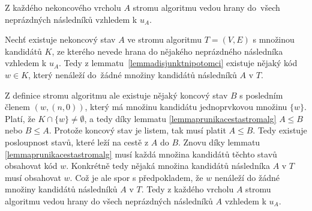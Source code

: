 \begin{tvrz}\label{tvrzvsichninaslednici}
    Z každého nekoncového vrcholu $A$ stromu algoritmu vedou hrany do~všech neprázdných následníků vzhledem k $u_A$.
\end{tvrz}
\begin{dukaz}
    Nechť existuje nekoncový stav $A$ ve stromu algoritmu $T = (V,E)$ s množinou kandidátů $K$, ze kterého nevede hrana do nějakého neprázdného následníka vzhledem k $u_A$. Tedy z lemmatu~\ref{lemmadisjunktnipotomci} existuje nějaký kód $w \in K$, který nenáleží do~žádné množiny kandidátů následníků $A$ v $T$. 

    Z definice stromu algoritmu ale existuje nějaký koncový stav $B$ s posledním členem $(w,(n,0))$, který má množinu kandidátu jednoprvkovou množinu $\{w\}$. Platí, že $K\cap \{w\} \neq \emptyset$, a tedy díky lemmatu \ref{lemmaprunikacestastromalg} $A \leq B$ nebo $B \leq A$. Protože koncový stav je listem, tak musí platit $A \leq B$. Tedy existuje posloupnost stavů, které leží na cestě z $A$ do $B$. Znovu díky lemmatu \ref{lemmaprunikacestastromalg} musí každá množina kandidátů těchto stavů obsahovat kód $w$. Konkrétně tedy nějaká množina kandidátů následníka $A$ v $T$ musí obsahovat $w$. Což je ale spor s předpokladem, že $w$ nenáleží do žádné množiny kandidátů následníků $A$ v $T$. Tedy z každého vrcholu $A$ stromu algoritmu vedou hrany do všech neprázdných následníků $A$ vzhledem k $u_A$. 
\end{dukaz}


